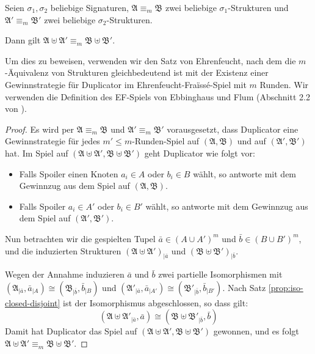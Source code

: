 \begin{prop}
\label{prop:m-equiv-closed}Seien $\sigma_{1},\sigma_{2}$ beliebige
Signaturen, $\mathfrak{A}\equiv_{m}\mathfrak{B}$ zwei beliebige $\sigma_{1}$-Strukturen
und $\mathfrak{A}'\equiv_{m}\mathfrak{B}'$ zwei beliebige $\sigma_{2}$-Strukturen.

Dann gilt $\mathfrak{A}\uplus\mathfrak{A}'\equiv_{m}\mathfrak{B}\uplus\mathfrak{B}'$.
\end{prop}
Um dies zu beweisen, verwenden wir den Satz von Ehrenfeucht, nach
dem die $m$-Äquivalenz von Strukturen gleichbedeutend ist mit der
Existenz einer Gewinnstrategie für Duplicator im Ehrenfeucht-Fraïssé-Spiel
mit $m$ Runden. Wir verwenden die Definition des EF-Spiels von Ebbinghaus
und Flum (Abschnitt 2.2 von \cite{EbbinghausFlum}).
\begin{proof}
Es wird per $\mathfrak{A}\equiv_{m}\mathfrak{B}$ und $\mathfrak{A}'\equiv_{m}\mathfrak{B}'$
vorausgesetzt, dass Duplicator eine Gewinnstrategie für jedes $m'\leqslant m$-Runden-Spiel
auf $\left(\mathfrak{A},\mathfrak{B}\right)$ und auf $\left(\mathfrak{A}',\mathfrak{B}'\right)$
hat. Im Spiel auf $\left(\mathfrak{A}\uplus\mathfrak{A}',\mathfrak{B}\uplus\mathfrak{B}'\right)$
geht Duplicator wie folgt vor:

\begin{itemize}
\item Falls Spoiler einen Knoten $a_{i}\in A$ oder $b_{i}\in B$ wählt,
so antworte mit dem Gewinnzug aus dem Spiel auf $\left(\mathfrak{A},\mathfrak{B}\right)$.
\item Falls Spoiler $a_{i}\in A'$ oder $b_{i}\in B'$ wählt, so antworte
mit dem Gewinnzug aus dem Spiel auf $\left(\mathfrak{A}',\mathfrak{B}'\right)$.
\end{itemize}
Nun betrachten wir die gespielten Tupel $\bar{a}\in\left(A\cup A'\right)^{m}$
und $\bar{b}\in\left(B\cup B'\right)^{m}$, und die induzierten Strukturen
$\left(\mathfrak{A}\uplus\mathfrak{A}'\right)_{\mid\bar{a}}$ und
$\left(\mathfrak{B}\uplus\mathfrak{B}'\right)_{\mid\bar{b}}$.

Wegen der Annahme induzieren $\bar{a}$ und $\bar{b}$ zwei partielle
Isomorphismen mit $\left(\mathfrak{A}_{\mid\bar{a}},\bar{a}_{\mid A}\right)\cong\left(\mathfrak{B}_{\mid\bar{b}},\bar{b}_{\mid B}\right)$
und $\left(\mathfrak{A}'_{\mid\bar{a}},\bar{a}_{\mid A'}\right)\cong\left(\mathfrak{B}'_{\mid\bar{b}},\bar{b}_{\mid B'}\right)$.
Nach Satz \ref{prop:iso-closed-disjoint} ist der Isomorphismus abgeschlossen,
so dass gilt:
\[
\left(\mathfrak{A}\uplus\mathfrak{A}'_{\mid\bar{a}},\bar{a}\right)\cong\left(\mathfrak{B}\uplus\mathfrak{B}'_{\mid\bar{b}},\bar{b}\right)
\]
Damit hat Duplicator das Spiel auf $\left(\mathfrak{A}\uplus\mathfrak{A}',\mathfrak{B}\uplus\mathfrak{B}'\right)$
gewonnen, und es folgt $\mathfrak{A}\uplus\mathfrak{A}'\equiv_{m}\mathfrak{B}\uplus\mathfrak{B}'$.
\end{proof}
